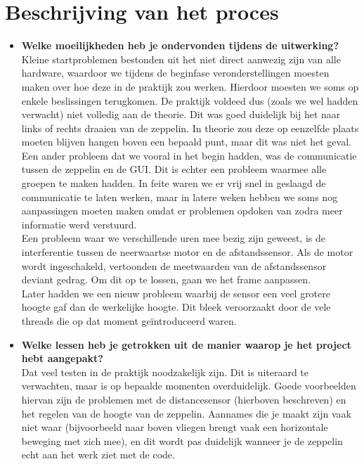 \documentclass[eind]{penoverslag}
\begin{document}
\section{Beschrijving van het proces}
\begin{itemize}
\item \textbf{Welke moeilijkheden heb je ondervonden tijdens de uitwerking?} \\
Kleine startproblemen bestonden uit het niet direct aanwezig zijn van alle hardware, waardoor we tijdens de beginfase veronderstellingen moesten maken over hoe deze in de praktijk zou werken. Hierdoor moesten we soms op enkele beslissingen terugkomen. De praktijk voldeed dus (zoals we wel hadden verwacht) niet volledig aan de theorie. Dit was goed duidelijk bij het naar links of rechts draaien van de zeppelin. In theorie zou deze op eenzelfde plaats moeten blijven hangen boven een bepaald punt, maar dit was niet het geval. \\
Een ander probleem dat we vooral in het begin hadden, was de communicatie tussen de zeppelin en de GUI. Dit is echter een probleem waarmee alle groepen te maken hadden. In feite waren we er vrij snel in geslaagd de communicatie te laten werken, maar in latere weken hebben we soms nog aanpassingen moeten maken omdat er problemen opdoken van zodra meer informatie werd verstuurd. \\
Een probleem waar we verschillende uren mee bezig zijn geweest, is de interferentie tussen de neerwaartse motor en de afstandssensor. Als de motor wordt ingeschakeld, vertoonden de meetwaarden van de afstandssensor deviant gedrag. Om dit op te lossen, gaan we het frame aanpassen. \\
Later hadden we een nieuw probleem waarbij de sensor een veel grotere hoogte gaf dan de werkelijke hoogte. Dit bleek veroorzaakt door de vele threads die op dat moment ge\"introduceerd waren. \\
\item \textbf{Welke lessen heb je getrokken uit de manier waarop je het project hebt aangepakt?} \\
Dat veel testen in de praktijk noodzakelijk zijn. Dit is uiteraard te verwachten, maar is op bepaalde momenten overduidelijk. Goede voorbeelden hiervan zijn de problemen met de distancesensor (hierboven beschreven) en het regelen van de hoogte van de zeppelin. Aannames die je maakt zijn vaak niet waar (bijvoorbeeld naar boven vliegen brengt vaak een horizontale beweging met zich mee), en dit wordt pas duidelijk wanneer je de zeppelin echt aan het werk ziet met de code. \\

\end{itemize}
\end{document}
